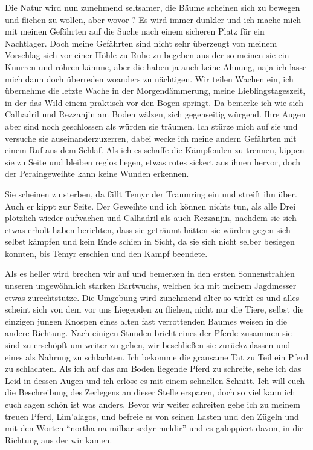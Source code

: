Die Natur wird nun zunehmend seltsamer, die Bäume scheinen sich zu bewegen und fliehen zu wollen, aber wovor ? Es wird immer dunkler und ich mache mich mit meinen Gefährten auf die Suche nach einem sicheren Platz für ein Nachtlager. Doch meine Gefährten sind nicht sehr überzeugt von meinem Vorschlag sich vor einer Höhle zu Ruhe zu begeben aus der so meinen sie ein Knurren und röhren kämme, aber die haben ja auch keine Ahnung, naja ich lasse mich dann doch überreden woanders zu nächtigen. Wir teilen Wachen ein, ich übernehme die letzte Wache in der Morgendämmerung, meine Lieblingstageszeit, in der das Wild einem praktisch vor den Bogen springt. Da bemerke ich wie sich Calhadril und Rezzanjin am Boden wälzen, sich gegenseitig würgend. Ihre Augen aber sind noch geschlossen als würden sie träumen. Ich stürze mich auf sie und versuche sie auseinanderzuzerren, dabei wecke ich meine andern Gefährten mit einem Ruf aus dem Schlaf. Als ich es schaffe die Kämpfenden zu trennen, kippen sie zu Seite und bleiben reglos liegen, etwas rotes sickert aus ihnen hervor, doch der Peraingeweihte kann keine Wunden erkennen.

Sie scheinen zu sterben, da fällt Temyr der Traumring ein und streift ihn über. Auch er kippt zur Seite. Der Geweihte und ich können nichts tun, als alle Drei plötzlich wieder aufwachen und Calhadril als auch Rezzanjin, nachdem sie sich etwas erholt haben berichten, dass sie geträumt hätten sie würden gegen sich selbst kämpfen und kein Ende schien in Sicht, da sie sich nicht selber besiegen konnten, bis Temyr erschien und den Kampf beendete.

Als es heller wird brechen wir auf und bemerken in den ersten Sonnenstrahlen unseren ungewöhnlich starken Bartwuchs, welchen ich mit meinem Jagdmesser etwas zurechtstutze. Die Umgebung wird zunehmend älter so wirkt es und alles scheint sich von dem vor uns Liegenden zu fliehen, nicht nur die Tiere, selbst die einzigen jungen Knospen eines alten fast verrottenden Baumes weisen in die andere Richtung. Nach einigen Stunden bricht eines der Pferde zusammen sie
sind zu erschöpft um weiter zu gehen, wir beschließen sie zurückzulassen und eines als Nahrung zu schlachten. Ich bekomme die grausame Tat zu Teil ein Pferd zu schlachten. Als ich auf das am Boden liegende Pferd zu schreite, sehe ich das Leid in dessen Augen und ich erlöse es mit einem schnellen Schnitt. Ich will euch die Beschreibung des Zerlegens an dieser Stelle ersparen, doch so viel kann ich euch sagen schön ist was anders. Bevor wir weiter schreiten gehe ich zu meinem treuen Pferd, Lim'alagos, und befreie es von seinen Lasten und den Zügeln und mit den Worten
``northa na milbar sedyr meldir'' und es galoppiert davon, in die Richtung aus der wir kamen.

